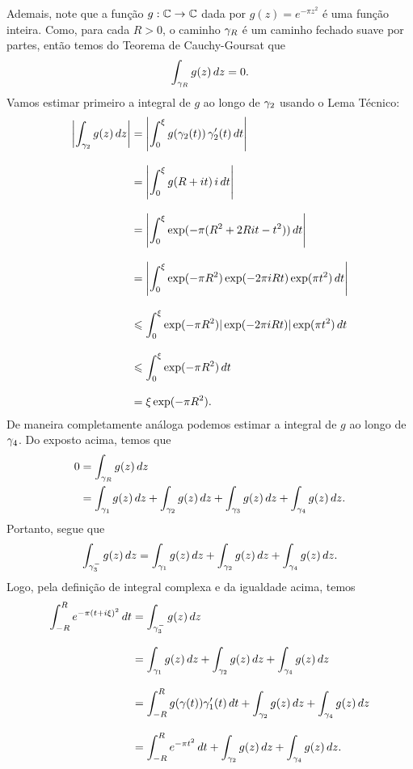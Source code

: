         Ademais, note que a função $g:\mathbb{C}\to\mathbb{C}$ dada por 
        $g(z)=e^{-\pi z^2}$ é uma função inteira. Como, para cada $R>0$, 
        o caminho $\gamma_R$ é um caminho fechado suave por partes, 
        então temos do Teorema de Cauchy-Goursat que
        \begin{equation*}
            \int_{\gamma_R} g(z)\, dz=0.
        \end{equation*}
        Vamos estimar primeiro a integral de $g$ ao longo de $\gamma_2$ usando o Lema Técnico:
        \begin{align*}
            \left| \int_{\gamma_2} g(z)\, dz \right|
            &=
            \left| \int_{0}^{\xi} g(\gamma_2(t))\,\gamma_2'(t)\, dt \right|
            \\[0.3cm]
            &=
            \left| \int_{0}^{\xi} g(R+it)\,i\, dt \right|
            \\[0.3cm]
            &=
            \left| \int_{0}^{\xi} \exp(-\pi(R^2+2Rit-t^2)) \, dt \right|
            \\[0.3cm]
            &=
            \left| \int_{0}^{\xi} \exp(-\pi R^2) \exp(-2\pi iRt) \exp(\pi t^2) \, dt \right|
            \\[0.3cm]
            &\leqslant
            \int_{0}^{\xi} \exp(-\pi R^2) |\exp(-2\pi iRt)| \exp(\pi t^2) \, dt
            \\[0.3cm]
            &\leqslant
            \int_{0}^{\xi} \exp(-\pi R^2)\, dt
            \\[0.3cm]
            &=
            \xi \exp(-\pi R^2).
        \end{align*}
        De maneira completamente análoga podemos estimar a integral de $g$ ao longo de $\gamma_4$.
        Do exposto acima, temos que
        \begin{align*}
            0 
            &= \int_{\gamma_{R}} g(z)\, dz 
            \\
            &=
            \int_{\gamma_1} g(z)\, dz+\int_{\gamma_2} g(z)\, dz+\int_{\gamma_3} g(z)\, dz+\int_{\gamma_4} g(z)\, dz.
        \end{align*}
        Portanto, segue que 
        \begin{equation*}
            \int_{\gamma^{-}_3} g(z)\, dz = \int_{\gamma_1} g(z)\, dz + 
            \int_{\gamma_2} g(z)\, dz+\int_{\gamma_4} g(z)\, dz.
        \end{equation*}
        Logo, pela definição de integral complexa e da igualdade acima, temos
        \begin{align*}
            \int_{-R}^{R} e^{-\pi(t+i\xi)^2}\, dt
            &=
            \int_{\gamma^{-}_3} g(z)\, dz 
            \\[0.3cm]
            &=
            \int_{\gamma_1} g(z)\, dz + 
            \int_{\gamma_2} g(z)\, dz+\int_{\gamma_4} g(z)\, dz
            \\[0.3cm]
            &=
            \int_{-R}^{R} g(\gamma(t))\gamma'_{1}(t)\, dt + 
            \int_{\gamma_2} g(z)\, dz+\int_{\gamma_4} g(z)\, dz
            \\[0.3cm]
            &=
            \int_{-R}^{R} e^{-\pi t^2}\, dt + 
            \int_{\gamma_2} g(z)\, dz+\int_{\gamma_4} g(z)\, dz.
        \end{align*}
